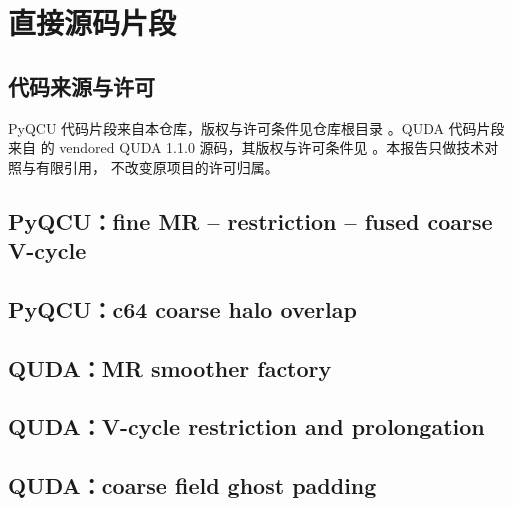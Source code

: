 \documentclass[UTF8,a4paper,11pt]{ctexart}
\begin{document}
\appendix
\section{直接源码片段}

\subsection{代码来源与许可}

PyQCU 代码片段来自本仓库，版权与许可条件见仓库根目录
。QUDA 代码片段来自  的
vendored QUDA 1.1.0 源码，其版权与许可条件见
。本报告只做技术对照与有限引用，
不改变原项目的许可归属。

\subsection{PyQCU：fine MR -- restriction -- fused coarse V-cycle}



\subsection{PyQCU：c64 coarse halo overlap}



\subsection{QUDA：MR smoother factory}



\subsection{QUDA：V-cycle restriction and prolongation}



\subsection{QUDA：coarse field ghost padding}
\end{document}
